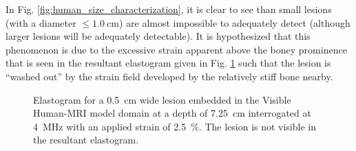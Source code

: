 			In Fig. \ref{fig:human_size_characterization}, it is clear to see than small lesions (with a diameter $\leq \SI{1.0}{\cm}$) are almost impossible to adequately detect (although larger lesions will be adequately detectable). It is hypothesized that this phenomenon is due to the excessive strain apparent above the boney prominence that is seen in the resultant elastogram given in Fig. \ref{fig:human_elastogram} such that the lesion is ``washed out'' by the strain field developed by the relatively stiff bone nearby.

			\begin{figure}[!t]
				\centering
				\caption[Sample elastogram of a Visible Human model lesion]{Elastogram for a \SI{0.5}{\cm} wide lesion embedded in the Visible Human-MRI model domain at a depth of \SI{7.25}{\cm} interrogated at \SI{4}{\MHz} with an applied strain of \SI{2.5}{\percent}. The lesion is not visible in the resultant elastogram.}
				\label{fig:human_elastogram}
			\end{figure}


